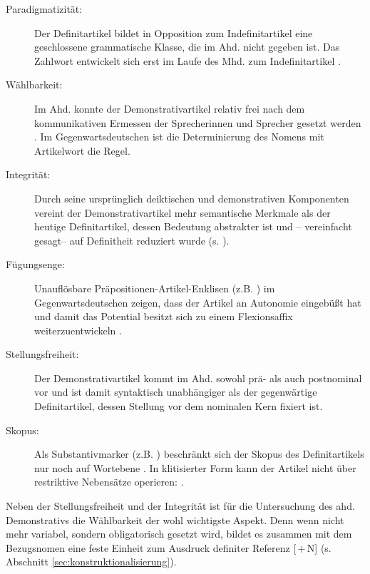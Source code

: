 \begin{description}
\item[Paradigmatizität:] Der Definitartikel bildet in Opposition zum Indefinitartikel eine geschlossene grammatische Klasse, die im Ahd. nicht gegeben ist. Das Zahlwort  entwickelt sich erst im Laufe des Mhd. zum Indefinitartikel \parencite{Szczepaniak2016a}. 
\item[Wählbarkeit:] Im Ahd. konnte der Demonstrativartikel relativ frei nach dem kommunikativen Ermessen der Sprecherinnen und Sprecher gesetzt werden \parencite{Oubouzar1992}. Im Gegenwartsdeutschen ist die Determinierung des Nomens mit Artikelwort die Regel. 
\item[Integrität:] Durch seine ursprünglich deiktischen und demonstrativen Komponenten vereint der Demonstrativartikel mehr semantische Merkmale als der heutige Definitartikel, dessen Bedeutung abstrakter ist und -- vereinfacht gesagt-- auf Definitheit reduziert wurde (s. \cite{Lehmann2015}).
\item[Fügungsenge:] Unauflösbare Präpositionen-Artikel-Enklisen (z.B. ) im Gegenwartsdeutschen zeigen, dass der Artikel an Autonomie eingebüßt hat und damit das Potential besitzt sich zu einem Flexionsaffix weiterzuentwickeln \parencite[s. hierzu][]{Nubling1992,Nubling2005}.  
\item[Stellungsfreiheit:] Der Demonstrativartikel kommt im Ahd. sowohl prä- als auch postnominal vor \parencite{Schrodt2004} und ist damit syntaktisch unabhängiger als der gegenwärtige Definitartikel, dessen Stellung vor dem nominalen Kern fixiert ist. 
\item[Skopus:] Als Substantivmarker (z.B. ) beschränkt sich der Skopus des Definitartikels nur noch auf Wortebene \parencite{Szczepaniak2011a}. In klitisierter Form kann der Artikel nicht über restriktive Nebensätze operieren:  \parencite[vgl.][112]{Nubling2005}.
\end{description}

\noindent
Neben der Stellungsfreiheit und der Integrität ist für die Untersuchung des ahd. Demonstrativs die Wählbarkeit der wohl wichtigste Aspekt. Denn wenn  nicht mehr variabel, sondern obligatorisch gesetzt wird, bildet es zusammen mit dem Bezugsnomen eine feste Einheit zum Ausdruck definiter Referenz [\,+\,N] (s. Abschnitt \ref{sec:konstruktionalisierung}).   

